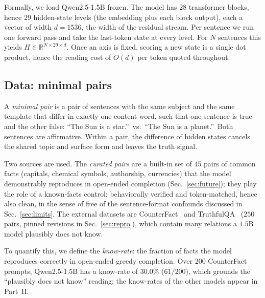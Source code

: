 \documentclass[11pt]{article}
\begin{document}
Formally, we load Qwen2.5-1.5B frozen. The model has $28$ transformer blocks,
hence $29$ hidden-state levels (the embedding plus each block output), each a
vector of width $d = 1536$, the width of the residual stream. Per sentence we
run one forward pass and take the last-token state at every level. For $N$
sentences this yields $H \in \mathbb{R}^{N \times 29 \times d}$. Once an axis
is fixed, scoring a new state is a single dot product, hence the reading cost
of $O(d)$ per token quoted throughout.

\subsection{Data: minimal pairs}
\label{sec:data}

A \emph{minimal pair} is a pair of sentences with the same subject and the
same template that differ in exactly one content word, such that one sentence
is true and the other false: ``The Sun is a star.''\ vs.\ ``The Sun is a
planet.''\ Both sentences are affirmative. Within a pair, the difference of
hidden states cancels the shared topic and surface form and leaves the truth
signal.

Two sources are used. The \emph{curated pairs} are a built-in set of $45$
pairs of common facts (capitals, chemical symbols, authorship, currencies)
that the model demonstrably reproduces in open-ended completion
(Sec.~\ref{sec:future}); they play the role of a known-facts control:
behaviorally verified and token-matched, hence also clean, in the sense of
free of the sentence-format confounds discussed in Sec.~\ref{sec:limits}.
The external datasets are CounterFact~\cite{counterfact} and
TruthfulQA~\cite{truthfulqa} ($250$ pairs, pinned revisions in
Sec.~\ref{sec:repro}), which contain many relations a $1.5$B model plausibly
does not know.

To quantify this, we define the \emph{know-rate}: the fraction of facts the
model reproduces correctly in open-ended greedy completion. Over $200$
CounterFact prompts, Qwen2.5-1.5B has a know-rate of $30.0\%$ ($61/200$),
which grounds the ``plausibly does not know'' reading; the know-rates of the
other models appear in Part~II.
\end{document}
